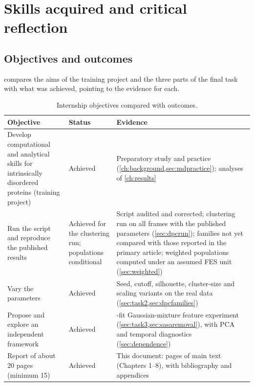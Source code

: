 \chapter{Skills acquired and critical reflection}
\label{ch:skills}
\section{Objectives and outcomes}
 compares the aims of the training project and the three parts of the final task with what was achieved, pointing to the evidence for each.

\begin{table}[htbp]
\centering
\caption{Internship objectives compared with outcomes.}
\label{tab:objectives}
\begin{tabularx}{\textwidth}{@{}>{\raggedright\arraybackslash}p{}>{\raggedright\arraybackslash}p{}>{\raggedright\arraybackslash}X@{}}
\toprule
Objective & Status & Evidence\\
\midrule
Develop computational and analytical skills for intrinsically disordered proteins (training project) & Achieved & Preparatory study and practice (\cref{ch:background,sec:mdpractice}); analyses of \cref{ch:results}\\
\addlinespace
Run the script and reproduce the published results & Achieved for the clustering run; populations conditional & Script audited and corrected; clustering run on all frames with the published parameters (\cref{sec:dpcrun}); families not yet compared with those reported in the primary article; weighted populations computed under an assumed FES unit (\cref{sec:weighted})\\
\addlinespace
Vary the parameters & Achieved & Seed, cutoff, silhouette, cluster-size and scaling variants on the real data (\cref{sec:task2,sec:dpcfamilies})\\
\addlinespace
Propose and explore an independent framework & Achieved & 50-fit Gaussian-mixture feature experiment (\cref{sec:task3,sec:sasaremoval}), with PCA and temporal diagnostics (\cref{sec:dependence})\\
\addlinespace
Report of about 20 pages (minimum 15) & Achieved & This document: \pageref*{mainend} pages of main text (Chapters 1--8), with bibliography and appendices\\
\bottomrule
\end{tabularx}
\end{table}

